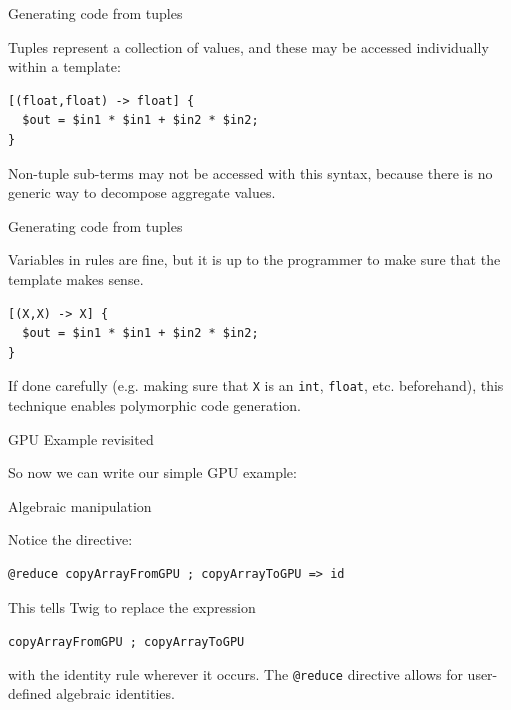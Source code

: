 \documentclass{beamer}
\begin{document}
\begin{frame}[fragile]{Generating code from tuples}

Tuples represent a collection of values, and these may be accessed
individually within a template:

\begin{verbatim}
[(float,float) -> float] {
  $out = $in1 * $in1 + $in2 * $in2;
}
\end{verbatim}

Non-tuple sub-terms may not be accessed with this syntax, because there is no
generic way to decompose aggregate values.

\end{frame}


\begin{frame}[fragile]{Generating code from tuples}

Variables in rules are fine, but it is up to the programmer to make sure that
the template makes sense.

\begin{verbatim}
[(X,X) -> X] {
  $out = $in1 * $in1 + $in2 * $in2;
}
\end{verbatim}

If done carefully (e.g. making sure that \texttt{X} is an \texttt{int},
\texttt{float}, etc. beforehand), this technique enables polymorphic code
generation.

\end{frame}


\begin{frame}[fragile]{GPU Example revisited}

So now we can write our simple GPU example:

\small

\normalsize

\end{frame}


\begin{frame}[fragile]{Algebraic manipulation}

Notice the \texttt{\@reduce} directive:

\begin{verbatim}
@reduce copyArrayFromGPU ; copyArrayToGPU => id
\end{verbatim}

This tells Twig to replace the expression

\texttt{copyArrayFromGPU ; copyArrayToGPU} 

with the identity rule wherever it occurs. The \texttt{@reduce} directive
allows for user-defined algebraic identities.

\end{frame}
\end{document}
